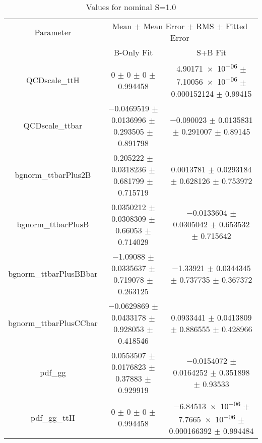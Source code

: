 \begin{table}
\centering
\caption{Values for nominal S=1.0}
\begin{tabular}{ccc}
\toprule
Parameter & \multicolumn{2}{c}{Mean $\pm$ Mean Error $\pm$ RMS $\pm$ Fitted Error}\\
 & B-Only Fit & S+B Fit\\
\midrule
QCDscale\_ttH & \num{0} $\pm$ \num{0} $\pm$ \num{0} $\pm$ \num{0.994458} & \num{4.90171e-06} $\pm$ \num{7.10056e-06} $\pm$ \num{0.000152124} $\pm$ \num{0.99415}\\
QCDscale\_ttbar & \num{-0.0469519} $\pm$ \num{0.0136996} $\pm$ \num{0.293505} $\pm$ \num{0.891798} & \num{-0.090023} $\pm$ \num{0.0135831} $\pm$ \num{0.291007} $\pm$ \num{0.89145}\\
bgnorm\_ttbarPlus2B & \num{0.205222} $\pm$ \num{0.0318236} $\pm$ \num{0.681799} $\pm$ \num{0.715719} & \num{0.0013781} $\pm$ \num{0.0293184} $\pm$ \num{0.628126} $\pm$ \num{0.753972}\\
bgnorm\_ttbarPlusB & \num{0.0350212} $\pm$ \num{0.0308309} $\pm$ \num{0.66053} $\pm$ \num{0.714029} & \num{-0.0133604} $\pm$ \num{0.0305042} $\pm$ \num{0.653532} $\pm$ \num{0.715642}\\
bgnorm\_ttbarPlusBBbar & \num{-1.09088} $\pm$ \num{0.0335637} $\pm$ \num{0.719078} $\pm$ \num{0.263125} & \num{-1.33921} $\pm$ \num{0.0344345} $\pm$ \num{0.737735} $\pm$ \num{0.367372}\\
bgnorm\_ttbarPlusCCbar & \num{-0.0629869} $\pm$ \num{0.0433178} $\pm$ \num{0.928053} $\pm$ \num{0.418546} & \num{0.0933441} $\pm$ \num{0.0413809} $\pm$ \num{0.886555} $\pm$ \num{0.428966}\\
pdf\_gg & \num{0.0553507} $\pm$ \num{0.0176823} $\pm$ \num{0.37883} $\pm$ \num{0.929919} & \num{-0.0154072} $\pm$ \num{0.0164252} $\pm$ \num{0.351898} $\pm$ \num{0.93533}\\
pdf\_gg\_ttH & \num{0} $\pm$ \num{0} $\pm$ \num{0} $\pm$ \num{0.994458} & \num{-6.84513e-06} $\pm$ \num{7.7665e-06} $\pm$ \num{0.000166392} $\pm$ \num{0.994484}\\
\bottomrule
\end{tabular}
\end{table}